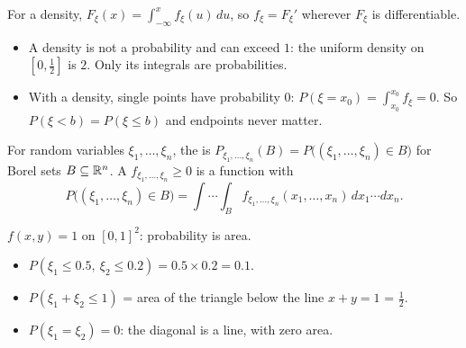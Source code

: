 For a density, $F_\xi(x)=\int_{-\infty}^x f_\xi(u)\,du$, so $f_\xi=F_\xi'$ wherever $F_\xi$ is differentiable.

\begin{itemize}
  \item A density is not a probability and can exceed $1$: the uniform density on $[0,\frac12]$ is $2$. Only its integrals are probabilities.
  \item With a density, single points have probability $0$: $P(\xi=x_0)=\int_{x_0}^{x_0}f_\xi=0$. So $P(\xi<b)=P(\xi\le b)$ and endpoints never matter.
\end{itemize}

\begin{definition}
For random variables $\xi_1,\dots,\xi_n$, the  is $P_{\xi_1,\dots,\xi_n}(B)=P\big((\xi_1,\dots,\xi_n)\in B\big)$ for Borel sets $B\subseteq\mathbb{R}^n$. A  $f_{\xi_1,\dots,\xi_n}\ge0$ is a function with
\[
  P\big((\xi_1,\dots,\xi_n)\in B\big)=\int\!\!\cdots\!\!\int_B f_{\xi_1,\dots,\xi_n}(x_1,\dots,x_n)\,dx_1\cdots dx_n .
\]
\end{definition}

\begin{example}
\label{ex:square}
$f(x,y)=1$ on $[0,1]^2$: probability is area.
\begin{itemize}
  \item $P(\xi_1\le0.5,\ \xi_2\le0.2)=0.5\times0.2=0.1$.
  \item $P(\xi_1+\xi_2\le1)$ = area of the triangle below the line $x+y=1$ = $\frac12$.
  \item $P(\xi_1=\xi_2)=0$: the diagonal is a line, with zero area.
\end{itemize}
\end{example}

\begin{pic}
\end{pic}

